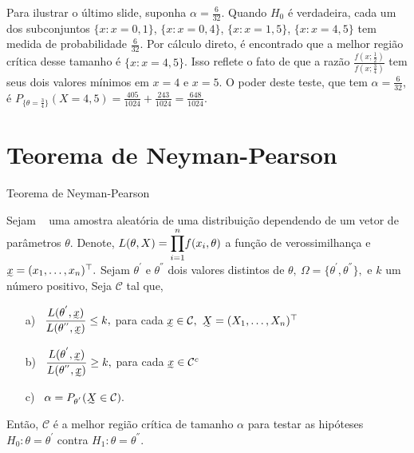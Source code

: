 \documentclass[12pt]{beamer}
\begin{document}
\begin{frame}{}
	\begin{block}{}
		\justifying
		Para ilustrar o último slide, suponha \(\alpha = \frac{6}{32}\). Quando \(H_0\) é verdadeira, cada um dos subconjuntos \(\{x : x = 0, 1\}\), \(\{x : x = 0, 4\}\), \(\{x : x = 1, 5\}\), \(\{x : x = 4, 5\}\) tem medida de probabilidade \(\frac{6}{32}\). Por cálculo direto, é encontrado que a melhor região crítica desse tamanho é \(\{x : x = 4, 5\}\). Isso reflete o fato de que a razão \(\frac{f(x;\frac{1}{2})}{f(x;\frac{3}{4})}\) tem seus dois valores mínimos em \(x = 4\) e \(x = 5\). O poder deste teste, que tem \(\alpha = \frac{6}{32}\), é \(P_{\{\theta=\frac{3}{4}\}}(X = 4, 5) = \frac{405}{1024} + \frac{243}{1024} = \frac{648}{1024}\).
	\end{block}
\end{frame}

\section{Teorema de Neyman-Pearson}
\begin{frame}{Teorema de Neyman-Pearson}
\vspace{-0.5cm}
\begin{Teorema}
\justifying
Sejam \seqX~ uma amostra aleatória de uma distribuição dependendo de um vetor de parâmetros $\theta.$ Denote,
$L(\theta,X)={\displaystyle \prod_{i=1}^{n}} f(x_{i},\theta)$ a função de verossimilhança e $\undertilde{x}=(x_{1},\ldots,x_{n})^{\top}.$ Sejam $\theta^{'}$ e $\theta^{''}$ dois valores distintos de $\theta,~\Omega=\{\theta^{'},\theta^{''}\},$ e $k$ um número positivo, Seja $\mathcal{C}$ tal que,
\begin{enumerate}
    \item[a)~]$\dfrac{L(\theta^{'},\undertilde{x})}{L(\theta^{''},\undertilde{x})}\leq k,$ para cada $\undertilde{x}\in\mathcal{C},~\undertilde{X}=(X_{1},\ldots,X_{n})^{\top}$
    \item[b)~]$\dfrac{L(\theta^{'},\undertilde{x})}{L(\theta^{''},\undertilde{x})}\geq k,$ para cada $\undertilde{x}\in\mathcal{C}^{c}$
    \item[c)~]$\alpha=P_{\theta^{'}}(\undertilde{X}\in\mathcal{C}).$
\end{enumerate}
Então, $\mathcal{C}$ é a melhor região crítica de tamanho $\alpha$ para testar as hipóteses $H_{0}:\theta=\theta^{'}$ contra $H_{1}:\theta=\theta^{''}.$
\end{Teorema}
\end{frame}
\end{document}
